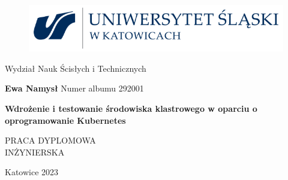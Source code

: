 \begin{titlepage}
\vglue -15mm
\begin{figure}[h!]
\includegraphics{img/logous.png}
\end{figure}
\begin{flushright}
\vglue 1cm
{\Large Wydział Nauk Ścisłych i Technicznych}
\end{flushright}
\begin{center}
\vskip 2.5cm
{\Large\textbf{Ewa Namysł}}
\vskip 0.5cm
{\Large Numer albumu 292001}
\vfill
\begin{doublespace}
{\huge \bf Wdrożenie i testowanie środowiska klastrowego w oparciu o oprogramowanie Kubernetes}
\end{doublespace}
\vfill
{\large PRACA DYPLOMOWA\\INŻYNIERSKA}
\end{center}
\vskip 2.5cm
\vspace{2.5cm}
\begin{center}
\Large Katowice 2023
\end{center}
\end{titlepage}




